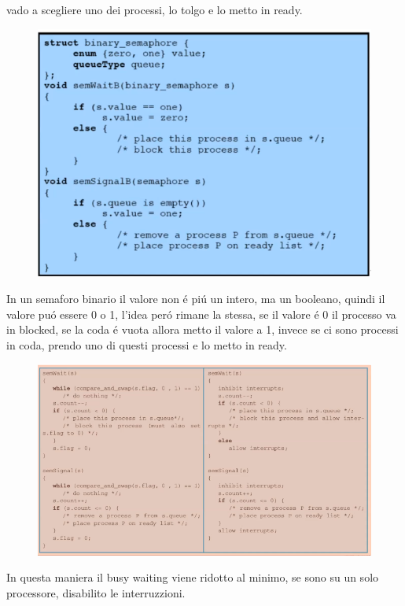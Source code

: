 vado a scegliere uno dei processi, lo tolgo e lo metto in ready.
\begin{figure}[H]
    \centering
    \includegraphics[width=0.7\linewidth]{immagini/ImplementazioneSemaforiBinari}
\end{figure}
In un semaforo binario il valore non é piú un intero, ma un booleano, quindi il valore puó essere 0 o 1, l'idea
peró rimane la stessa, se il valore é 0 il processo va in blocked, se la coda é vuota allora metto il valore a 1,
invece se ci sono processi in coda, prendo uno di questi processi e lo metto in ready.
\begin{figure}[H]
    \centering
    \includegraphics[width=0.7\linewidth]{immagini/PossibileImplementazioneDiSemafori}
\end{figure}
In questa maniera il busy waiting viene ridotto al minimo, se sono su un solo processore, disabilito le interruzzioni.
